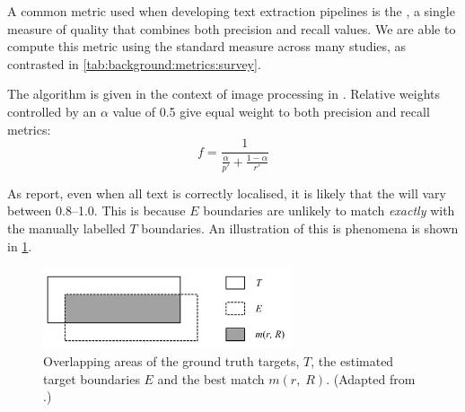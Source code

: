A common metric used when developing text extraction pipelines is the \fscore, a single measure of quality that combines both precision and recall values. We are able to compute this metric using the standard measure across many studies, as contrasted in \cref{tab:background:metrics:survey}.

The \fscore{} algorithm is given in the context of image processing in \citet{Lucas:2003iw}. Relative weights controlled by an $\alpha$ value of 0.5 give equal weight to both precision and recall metrics:
\begin{equation*}
  f = \frac{1}{\frac{\alpha}{p'} + \frac{1-\alpha}{r'}}
\end{equation*}

As \citet{Chen:2011ul} report, even when all text is correctly localised, it is likely that the \fscore{} will vary between 0.8--1.0. This is because $E$ boundaries are unlikely to match \textit{exactly} with the manually labelled $T$ boundaries. An illustration of this is phenomena is shown in \cref{fig:background:metrics:ye2005_overlapping}.

\begin{figure}[p]
  \centering
  \includegraphics[width=0.65\textwidth]{images/background/ye2005_overlapping}
  \caption[Overlapping areas of ground truth and estimated targets]{Overlapping areas of the ground truth targets, $T$, the estimated target boundaries $E$ and the best match $m(r,\;R)$. (Adapted from \citep{Ye:2005wu}.)}
  \label{fig:background:metrics:ye2005_overlapping}
\end{figure}

